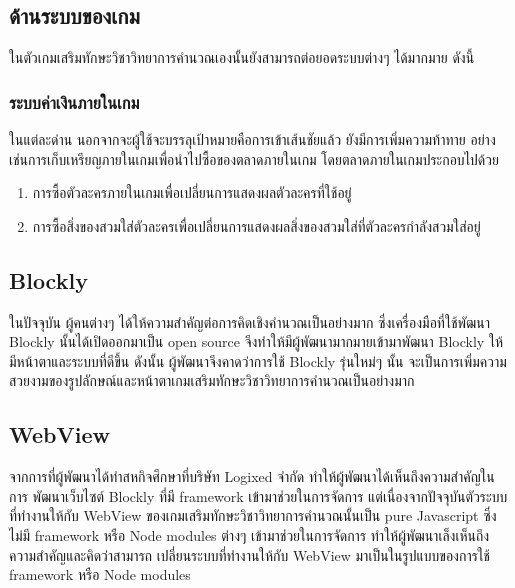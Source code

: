\subsection{ด้านระบบของเกม}
ในตัวเกมเสริมทักษะวิชาวิทยาการคำนวณเองนั้นยังสามารถต่อยอดระบบต่างๆ ได้มากมาย ดังนี้

\subsubsection{ระบบค่าเงินภายในเกม}
ในแต่ละด่าน นอกจากจะผู้ใช้จะบรรลุเป้าหมายคือการเข้าเส้นชัยแล้ว ยังมีการเพิ่มความท้าทาย อย่างเช่นการเก็บเหรียญภายในเกมเพื่อนำไปซื้อของตลาดภายในเกม 
โดยตลาดภายในเกมประกอบไปด้วย
\begin{enumerate}
    \item การซื้อตัวละครภายในเกมเพื่อเปลี่ยนการแสดงผลตัวละครที่ใช้อยู่
    \item การซื้อสิ่งของสวมใส่ตัวละครเพื่อเปลี่ยนการแสดงผลสิ่งของสวมใส่ที่ตัวละครกำลังสวมใส่อยู่
\end{enumerate}

\subsection{Blockly}
ในปัจจุบัน ผู้คนต่างๆ ได้ให้ความสำคัญต่อการคิดเชิงคำนวณเป็นอย่างมาก ซึ่งเครื่องมือที่ใช้พัฒนา Blockly นั้นได้เปิดออกมาเป็น open source
จึงทำให้มีผู้พัฒนามากมายเข้ามาพัฒนา Blockly ให้มีหน้าตาและระบบที่ดีขึ้น ดังนั้น ผู้พัฒนาจึงคาดว่าการใช้ Blockly รุ่นใหม่ๆ นั้น
จะเป็นการเพิ่มความสวยงามของรูปลักษณ์และหน้าตาเกมเสริมทักษะวิชาวิทยาการคำนวณเป็นอย่างมาก

\subsection{WebView}
จากการที่ผู้พัฒนาได้ทำสหกิจศึกษาที่บริษัท Logixed จำกัด ทำให้ผู้พัฒนาได้เห็นถึงความสำคัญในการ \newline พัฒนาเว็บไซต์ Blockly ที่มี framework เข้ามาช่วยในการจัดการ
แต่เนื่องจากปัจจุบันตัวระบบที่ทำงานให้กับ WebView ของเกมเสริมทักษะวิชาวิทยาการคำนวณนั้นเป็น pure Javascript ซึ่งไม่มี framework หรือ Node modules ต่างๆ เข้ามาช่วยในการจัดการ
ทำให้ผู้พัฒนาเล็งเห็นถึงความสำคัญและคิดว่าสามารถ \newline เปลี่ยนระบบที่ทำงานให้กับ WebView มาเป็นในรูปแบบของการใช้ framework หรือ Node modules


